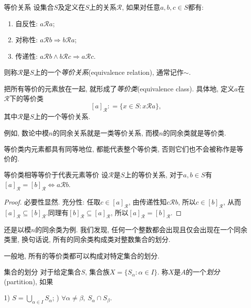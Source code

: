 \begin{definition}{等价关系}
	设集合$S$及定义在$S$上的关系$\mathcal{R}$, 如果对任意$a, b, c \in S$都有: 
	\begin{enumerate}
		\item 自反性: $a\mathcal{R} a$; 
		\item 对称性: $a\mathcal{R} b \Rightarrow b\mathcal{R} a$; 
		\item 传递性: $a\mathcal{R} b \wedge b\mathcal{R} c \Rightarrow a\mathcal{R} c$.
	\end{enumerate}
	则称$\mathcal{R}$是$S$上的一个\textit{等价关系}(equivalence relation), 通常记作$\sim$.
\end{definition}

把所有等价的元素放在一起, 就形成了\textit{等价类}(equivalence class). 具体地, 定义$a$在$\mathcal{R}$下的等价类$$[a]_{\mathcal{R}} : = \{ x \in S: x\mathcal{R}a \}, $$其中$\mathcal{R}$是$S$上的一个等价关系.

例如, 数论中模$n$的同余关系就是一类等价关系, 而模$n$的同余类就是等价类.

等价类内元素都具有同等地位, 都能代表整个等价类, 否则它们也不会被称作是等价的.

\begin{proposition}{等价类相等等价于代表元素等价}
	设$\mathcal{R}$是$S$上的等价关系, 对于$a, b \in S$有$[a]_{\mathcal{R}} = [b]_{\mathcal{R}} \Leftrightarrow a\mathcal{R} b$. 
\end{proposition}
\begin{proof}
	必要性显然. 充分性: 任取$c \in [a]_{\mathcal{R}}$, 由传递性知$c \mathcal{R} b$, 所以$c \in [b]_{\mathcal{R}}$, 从而$[a]_{\mathcal{R}} \subseteq [b]_{\mathcal{R}}$.同理有$[b]_{\mathcal{R}} \subseteq [a]_{\mathcal{R}}$, 所以$[a]_{\mathcal{R}} = [b]_{\mathcal{R}}$.
\end{proof}

还是以模$n$的同余类为例. 我们发现, 任何一个整数都会出现且仅会出现在一个同余类里, 换句话说, 所有的同余类构成类对整数集合的划分. 

一般地, 所有的等价类都可以构成对特定集合的划分. 

\begin{definition}{集合的划分}
	对于给定集合$S$, 集合族$X=\{ S_{\alpha} :  \alpha \in I \}$. 称$X$是$A$的一个\textit{划分}(partition), 如果
	\begin{center}
		1) $S = \bigcup_{\alpha \in I} S_{\alpha}$; ) $\forall \alpha \neq \beta , ~S_{\alpha} \cap S_{\beta}$.
	\end{center}
\end{definition}

